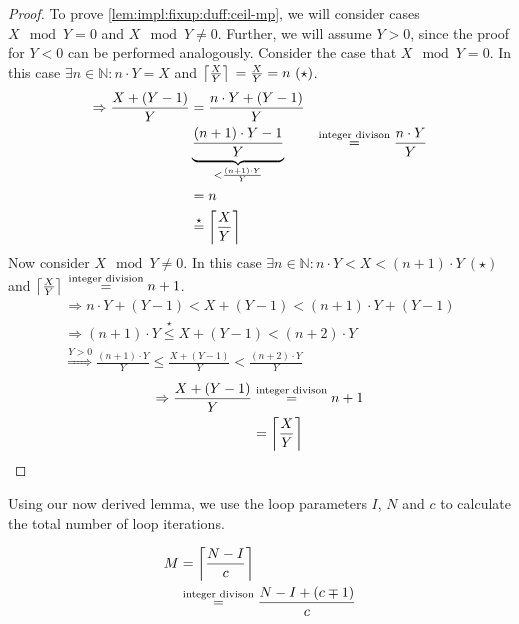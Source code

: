 \begin{proof}
    To prove \cref{lem:impl:fixup:duff:ceil-mp}, we will consider cases $X \mod Y = 0$ and $X \mod Y \neq 0$.
    Further, we will assume $Y > 0$, since the proof for $Y < 0$ can be performed analogously.
    Consider the case that $X \mod Y = 0$.
    In this case $\exists n \in \mathbb{N}: n \cdot Y = X$ and $\left\lceil{}\frac{X}{Y}\right\rceil{} = \frac{X}{Y} = n~(\star)$.
    \begin{align*}
        \Rightarrow \frac{X + (Y - 1)}{Y} &= \frac{n \cdot Y + (Y - 1)}{Y}\\
        &\underbrace{\frac{(n + 1) \cdot Y - 1}{Y}}_{< \frac{(n + 1) \cdot Y}{Y}}
        &\overset{\text{integer divison}}{=} \frac{n \cdot Y}{Y}\\
        &= n\\
        &\overset{\star}{=} \left\lceil{}\frac{X}{Y}\right\rceil{}
    \end{align*}
    Now consider $X \mod Y \neq 0$.
    In this case $\exists n \in \mathbb{N}: n \cdot Y < X < (n + 1) \cdot Y~(\star)$ and $\left\lceil{}\frac{X}{Y}\right\rceil{} \overset{\text{integer division}}{=} n + 1$.
    \begin{align*}
        \Rightarrow n \cdot Y + (Y - 1) < X + (Y - 1) < (n + 1) \cdot Y + (Y - 1)\\
        \Rightarrow (n + 1) \cdot Y \overset{\star}{\leq} X + (Y - 1) < (n + 2) \cdot Y\\
        \overset{Y > 0}{\Rightarrow} \frac{(n + 1) \cdot Y}{Y} \leq \frac{X + (Y - 1)}{Y} < \frac{(n + 2) \cdot Y}{Y}
    \end{align*}
    \begin{align*}
        \Rightarrow \frac{X + (Y - 1)}{Y} &\overset{\text{integer divison}}= n + 1\\
        &= \left\lceil{}\frac{X}{Y}\right\rceil{}
    \end{align*}
\end{proof}

Using our now derived lemma, we use the loop parameters $I$, $N$ and $c$ to calculate the total number of loop iterations.

\begin{equation}\label{eqn:impl:fixup:duff:total-iteration-based-on-bounds}
\begin{aligned}
    M &= \left\lceil{}\frac{N - I}{c}\right\rceil{} \\
    & \overset{\text{integer divison}}{=} \frac{N - I + (c \mp 1)}{c}
\end{aligned}
\end{equation}

